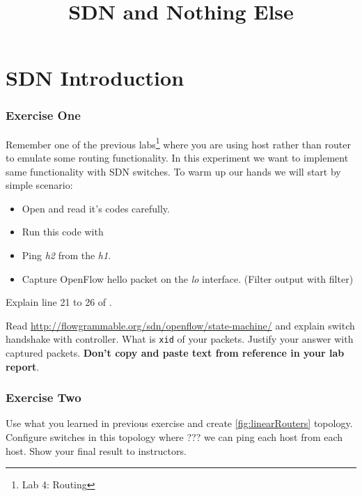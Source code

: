 \documentclass{../UTNetLab}
\title{SDN and Nothing Else}
\begin{document}
\part{SDN Introduction}
    \section{Exercise One}
    Remember one of the previous labs\footnote{Lab 4: Routing} where you are using host rather than router to emulate some routing functionality. In this experiment we want to implement same functionality with SDN switches. To warm up our hands we will start by simple scenario:

    \begin{itemize}
        \item Open  and read it's codes carefully.
        \item Run this code with 
        \item Ping \textit{h2} from the \textit{h1}.
        \item Capture OpenFlow hello packet on the \textit{lo} interface. (Filter  output with  filter)
    \end{itemize}

    \begin{report}
        \item Explain line 21 to 26 of .
        \item Read \url{http://flowgrammable.org/sdn/openflow/state-machine/} and explain switch handshake with controller. What is \texttt{xid} of your packets. Justify your answer with captured packets. \textbf{Don't copy and paste text from reference in your lab report}.
    \end{report}

    \section{Exercise Two}
    Use what you learned in previous exercise and create \autoref{fig:linearRouters} topology. Configure switches in this topology where ??? we can ping each host from each host. Show your final result to instructors.
\end{document}
